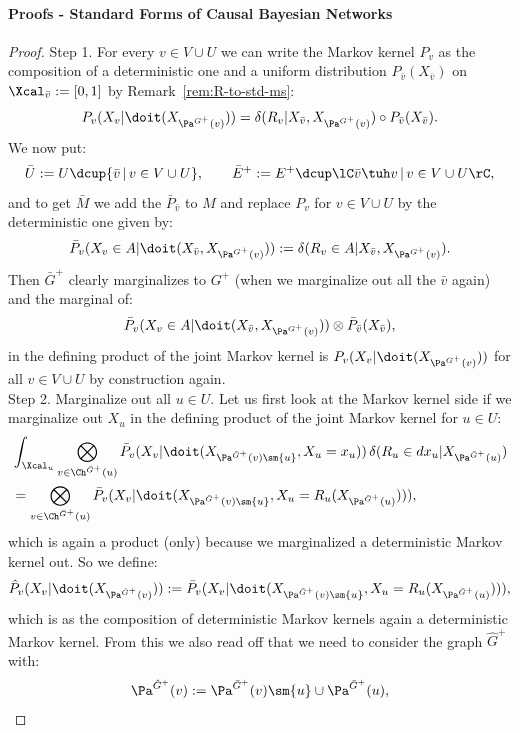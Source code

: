 \paragraph{Proofs - Standard Forms of Causal Bayesian Networks}\hfill

\begin{proof}
    Step 1. For every $v \in V \cup U$ we can write the Markov kernel $P_v$ as the composition of a deterministic one and 
    a uniform distribution $P_{\bar v}(X_{\bar v})$ on $\Xcal_{\bar v}:=[0,1]$ by Remark~\ref{rem:R-to-std-ms}:
    \[ P_v(X_v|\doit(X_{\Pa^{G^+}(v)})) = \delta(R_v|X_{\bar v}, X_{\Pa^{G^+}(v)}) \circ P_{\bar v}(X_{\bar v}). \]
    We now put:
    \[ \bar U := U \dcup \{ \bar v\,|\, v \in V \cup U\},\qquad \bar E^+ := E^+ \dcup \lC \bar v \tuh v\,|\, v \in V \cup U \rC, \]
    and to get $\bar M$ we add the $\bar P_{\bar v}$ to $M$ and replace $P_v$ for $v \in V \cup U$ 
    by the deterministic one given by:
    \[ \bar P_v(X_v \in A|\doit(X_{\bar v},X_{\Pa^{G^+}(v)})) :=  \delta(R_v \in A|X_{\bar v}, X_{\Pa^{G^+}(v)}). \]
    Then $\bar G^+$ clearly marginalizes to $G^+$ (when we marginalize out all the $\bar v$ again) and the marginal of:
    \[   \bar P_v(X_v \in A|\doit(X_{\bar v},X_{\Pa^{G^+}(v)}))  \otimes \bar P_{\bar v}(X_{\bar v}),\]
    in the defining product of the joint Markov kernel
    is $P_v(X_v|\doit(X_{\Pa^{G^+}(v)}))$ for all $ v \in V \cup U$ by construction again.\\ 
    Step 2. Marginalize out all $u \in U$.    
    Let us first look at the Markov kernel side if we marginalize out $X_u$ 
    in the defining product of the joint Markov kernel for $u \in U$:
    \begin{align*}
     &   \int_{\Xcal_u} \bigotimes_{v \in \Ch^{\bar G^+}(u)} \bar P_v(X_v|\doit(X_{\Pa^{\bar G^+}(v)\sm\{u\}},
        X_u=x_u)) \, \delta(R_u \in dx_u|X_{\Pa^{\bar G^+}(u)}) \\
   & = \bigotimes_{v \in \Ch^{\bar G^+}(u)} \bar P_v(X_v|\doit(X_{\Pa^{\bar G^+}(v)\sm\{u\}},
   X_u=R_u(X_{\Pa^{\bar G^+}(u)}))), 
    \end{align*}
    which is again a product (only) because we marginalized a deterministic Markov kernel out.
    So we define:
    \[ \hat P_v(X_v|\doit(X_{\Pa^{\hat G^+}(v)})) := \bar P_v(X_v|\doit(X_{\Pa^{\bar G^+}(v)\sm\{u\}},
   X_u=R_u(X_{\Pa^{\bar G^+}(u)}))), \]
   which is as the composition of deterministic Markov kernels again a deterministic Markov kernel.
    From this we also read off that we need to consider the graph $\hat G^+$ with:
    \[ \Pa^{\hat G^+}(v) := {\Pa^{\bar G^+}(v)\sm\{u\}} \cup {\Pa^{\bar G^+}(u)},\]

\end{proof}
